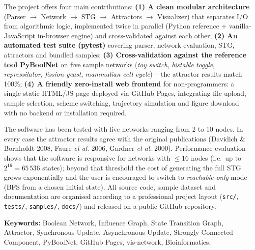 \documentclass[oneside,final]{hcmut-report}
\begin{document}
\vspace{0.3em}

The project offers four main contributions: \textbf{(1) A clean modular architecture} (Parser $\rightarrow$ Network $\rightarrow$ STG $\rightarrow$ Attractors $\rightarrow$ Visualizer) that separates I/O from algorithmic logic, implemented twice in parallel (Python reference + vanilla-JavaScript in-browser engine) and cross-validated against each other; \textbf{(2) An automated test suite (pytest)} covering parser, network evaluation, STG, attractors and bundled samples; \textbf{(3) Cross-validation against the reference tool PyBoolNet} on five sample networks (\textit{toy switch}, \textit{bistable toggle}, \textit{repressilator}, \textit{fission yeast}, \textit{mammalian cell cycle}) -- the attractor results match 100\%; \textbf{(4) A friendly zero-install web frontend} for non-programmers: a single static HTML/JS page deployed via GitHub Pages, integrating file upload, sample selection, scheme switching, trajectory simulation and figure download with no backend or installation required.

\vspace{0.3em}

The software has been tested with five networks ranging from 2 to 10 nodes. In every case the attractor results agree with the original publications (Davidich \& Bornholdt 2008, Faure \emph{et al.} 2006, Gardner \emph{et al.} 2000). Performance evaluation shows that the software is responsive for networks with $\leq 16$ nodes (i.e.\ up to $2^{16}=65\,536$ states); beyond that threshold the cost of generating the full STG grows exponentially and the user is encouraged to switch to \textit{reachable-only} mode (BFS from a chosen initial state). All source code, sample dataset and documentation are organised according to a professional project layout (\texttt{src/}, \texttt{tests/}, \texttt{samples/}, \texttt{docs/}) and released on a public GitHub repository.

\vspace{0.3em}

\noindent\textbf{Keywords:} Boolean Network, Influence Graph, State Transition Graph, Attractor, Synchronous Update, Asynchronous Update, Strongly Connected Component, PyBoolNet, GitHub Pages, vis-network, Bioinformatics.

\begingroup
  \setlength{\parskip}{4pt}
  \cleardoublepage
  \tableofcontents
\end{document}
